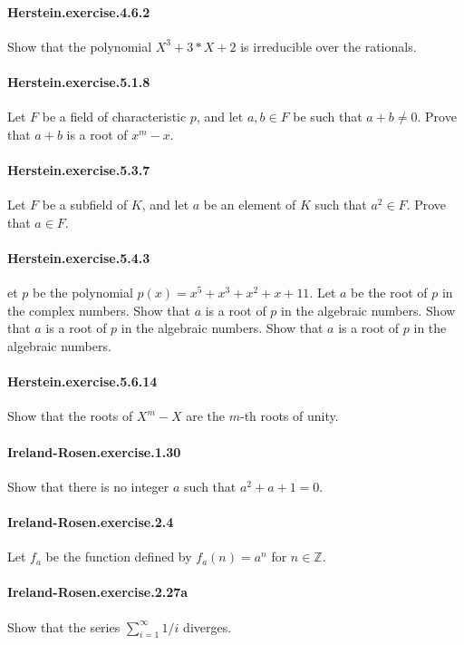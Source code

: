 \documentclass{article}
\begin{document}
\paragraph{Herstein.exercise.4.6.2} Show that the polynomial $X^3 + 3*X + 2$ is irreducible over the rationals.

\paragraph{Herstein.exercise.5.1.8} Let $F$ be a field of characteristic $p$, and let $a, b \in F$ be such that $a + b \neq 0$. Prove that $a + b$ is a root of $x^m - x$.

\paragraph{Herstein.exercise.5.3.7} Let $F$ be a subfield of $K$, and let $a$ be an element of $K$ such that $a^2 \in F$. Prove that $a \in F$.

\paragraph{Herstein.exercise.5.4.3} et $p$ be the polynomial $p(x)=x^5+x^3+x^2+x+11$. Let $a$ be the root of $p$ in the complex numbers. Show that $a$ is a root of $p$ in the algebraic numbers. Show that $a$ is a root of $p$ in the algebraic numbers. Show that $a$ is a root of $p$ in the algebraic numbers.

\paragraph{Herstein.exercise.5.6.14} Show that the roots of $X ^ m - X$ are the $m$-th roots of unity.

\paragraph{Ireland-Rosen.exercise.1.30} Show that there is no integer $a$ such that $a^2 + a + 1 = 0$.

\paragraph{Ireland-Rosen.exercise.2.4} Let $f_a$ be the function defined by $f_a(n)=a^n$ for $n \in \mathbb{Z}$.

\paragraph{Ireland-Rosen.exercise.2.27a} Show that the series
  $\sum_{i=1}^\infty 1/i$ diverges.
\end{document}
